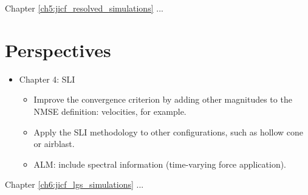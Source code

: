 Chapter \ref{ch5:jicf_resolved_simulations} ...


\section*{Perspectives}

\begin{itemize}

\item Chapter 4: SLI

	\begin{itemize}

		\item Improve the convergence criterion by adding other magnitudes to the NMSE definition: velocities, for example.
		
		\item Apply the SLI methodology to other configurations, such as hollow cone or airblast.
		
		\item ALM: include spectral information (time-varying force application).

	\end{itemize}

\end{itemize}




Chapter \ref{ch6:jicf_lgs_simulations} ...